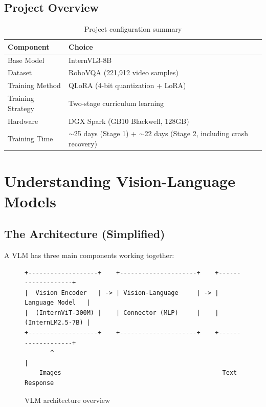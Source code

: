 \documentclass[11pt,a4paper]{article}
\begin{document}
\subsection{Project Overview}

\begin{table}[H]
\centering
\begin{tabular}{@{}ll@{}}
\toprule
\textbf{Component} & \textbf{Choice} \\
\midrule
Base Model & InternVL3-8B \\
Dataset & RoboVQA (221,912 video samples) \\
Training Method & QLoRA (4-bit quantization + LoRA) \\
Training Strategy & Two-stage curriculum learning \\
Hardware & DGX Spark (GB10 Blackwell, 128GB) \\
Training Time & $\sim$25 days (Stage 1) + $\sim$22 days (Stage 2, including crash recovery) \\
\bottomrule
\end{tabular}
\caption{Project configuration summary}
\end{table}

\section{Understanding Vision-Language Models}

\subsection{The Architecture (Simplified)}

A VLM has three main components working together:

\begin{figure}[H]
\centering
\begin{tcolorbox}[colback=white,colframe=anthropicblue,width=\textwidth]
\begin{verbatim}
+-------------------+    +---------------------+    +-------------------+
|  Vision Encoder   | -> | Vision-Language     | -> |  Language Model   |
|  (InternViT-300M) |    | Connector (MLP)     |    |  (InternLM2.5-7B) |
+-------------------+    +---------------------+    +-------------------+
       ^                                                    |
    Images                                            Text Response
\end{verbatim}
\end{tcolorbox}
\caption{VLM architecture overview}
\end{figure}
\end{document}
